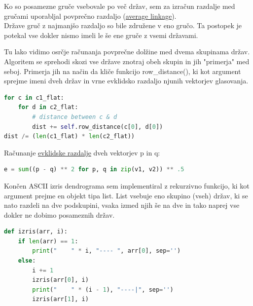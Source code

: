 \documentclass[a4paper,11pt]{article}
\begin{document}
Ko so posamezne gruče vsebovale po več držav, sem za izračun razdalje med gručami uporabljal povprečno razdaljo
(\href{https://www.statistics.com/glossary/average-linkage-clustering/}{average linkage}).
\\Države gruč z najmanjšo razdaljo so bile združene v eno gručo. Ta postopek je potekal vse dokler nismo imeli le še ene
gruče z vsemi državami.

Tu lako vidimo osrčje računanja povprečne dolžine med dvema skupinama držav. Algoritem se sprehodi skozi vse države znotraj
obeh skupin in jih "primerja" med seboj. Primerja jih na način da kliče funkcijo row\_distance(), ki kot argument sprejme
imeni dveh držav in vrne evklidsko razdaljo njunih vektorjev glasovanja.

\begin{lstlisting}[language=Python, caption=merge\_clusters(clusters{,} c1{,} c2)]
for c in c1_flat:
    for d in c2_flat:
        # distance between c & d
        dist += self.row_distance(c[0], d[0])
dist /= (len(c1_flat) * len(c2_flat))
\end{lstlisting}

Računanje \href{https://en.wikipedia.org/wiki/Euclidean_distance}{evklidske razdalje} dveh vektorjev p in q:

\begin{lstlisting}[language=Python, caption=euclidean distance]
e = sum((p - q) ** 2 for p, q in zip(v1, v2)) ** .5
\end{lstlisting}

Končen ASCII izris dendrograma sem implementiral z rekurzivno funkcijo, ki kot argument prejme en objekt tipa list.
List vsebuje eno skupino (vseh) držav, ki se nato razdeli na dve podskupini, vsaka izmed njih še na dve in tako naprej
vse dokler ne dobimo posameznih držav.
\pagebreak
\begin{lstlisting}[language=Python, caption=Function izris()]
def izris(arr, i):
    if len(arr) == 1:
        print("    " * i, "---- ", arr[0], sep='')
    else:
        i += 1
        izris(arr[0], i)
        print("    " * (i - 1), "----|", sep='')
        izris(arr[1], i)
\end{lstlisting}
\end{document}
